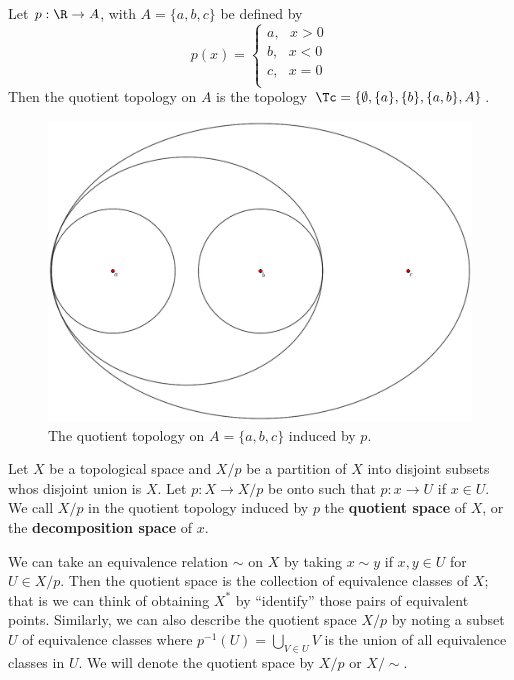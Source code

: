 \begin{example}
    Let $p:\R \rightarrow A$, with  $A=\{a,b,c\}$ be defined by
        \begin{equation*}
            p(x)=\begin{cases}
                    a, \text{ } x>0 \\
                    b, \text{ } x<0 \\
                    c, \text{ } x=0 \\
                \end{cases}
        \end{equation*}
    Then the quotient topology on $A$ is the topology  $\Tc=\{\emptyset, \{a\}, \{b\}, \{a,b\},A\}$.

    \begin{figure}[h]
        \centering
        \includegraphics[scale = 0.2]{Figures/Chapter2/quotientOnABC.eps}
        \caption{The quotient topology on $A=\{a,b,c\}$ induced by $p$.}
    \end{figure}
\end{example}

\begin{definition}
    Let $X$ be a topological space and  $X/p$ be a partition of  $X$ into disjoint subsets whos
    disjoint union is  $X$. Let  $p:X \rightarrow X/p$ be onto such that  $p:x \rightarrow U$ if  $x
    \in U$. We call  $X/p$ in the quotient topology induced by $p$ the \textbf{quotient space} of $X$, or the
    \textbf{decomposition space} of $x$.
\end{definition}

We can take an equivalence relation $\sim$ on  $X$ by taking  $x \sim y$ if  $x,y \in U$ for  $U \in
X/p$. Then the quotient space is the collection of equivalence classes of $X$; that is we can think
of obtaining $X^*$ by ``identify'' those pairs of equivalent points. Similarly, we can also describe
the quotient space $X/p$ by noting a subset $U$ of equivalence classes where $p^{-1}(U)=\bigcup_{V
\in U}{V}$ is the union of all equivalence classes in $U$. We will denote the quotient space by
$X/p$ or  $X/\sim$.

